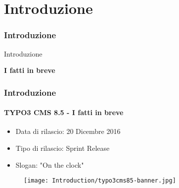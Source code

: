 %

\section{Introduzione}
\begin{frame}[fragile]
	\frametitle{Introduzione}

	\begin{center}\huge{Introduzione}\end{center}
	\begin{center}\huge{\color{typo3darkgrey}\textbf{I fatti in breve}}\end{center}

\end{frame}

\begin{frame}[fragile]
	\frametitle{Introduzione}
	\framesubtitle{TYPO3 CMS 8.5 - I fatti in breve}

	\begin{itemize}
		\item Data di rilascio: 20 Dicembre 2016
		\item Tipo di rilascio: Sprint Release
		\item Slogan: "On the clock"
	\end{itemize}

	\begin{figure}
		\texttt{[image: Introduction/typo3cms85-banner.jpg]}
	\end{figure}

\end{frame}

